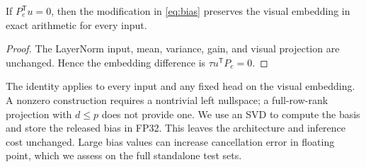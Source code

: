 \begin{proposition}
If $P_e^{\mathsf T}u=0$, then the modification in \cref{eq:bias} preserves the visual embedding in exact arithmetic for every input.
\end{proposition}
\begin{proof}
The LayerNorm input, mean, variance, gain, and visual projection are unchanged. Hence the embedding difference is $\tau u^{\mathsf T}P_e=0$.
\end{proof}

The identity applies to every input and any fixed head on the visual embedding. A nonzero construction requires a nontrivial left nullspace; a full-row-rank projection with $d\le p$ does not provide one. We use an SVD to compute the basis and store the released bias in FP32. This leaves the architecture and inference cost unchanged. Large bias values can increase cancellation error in floating point, which we assess on the full standalone test sets.

